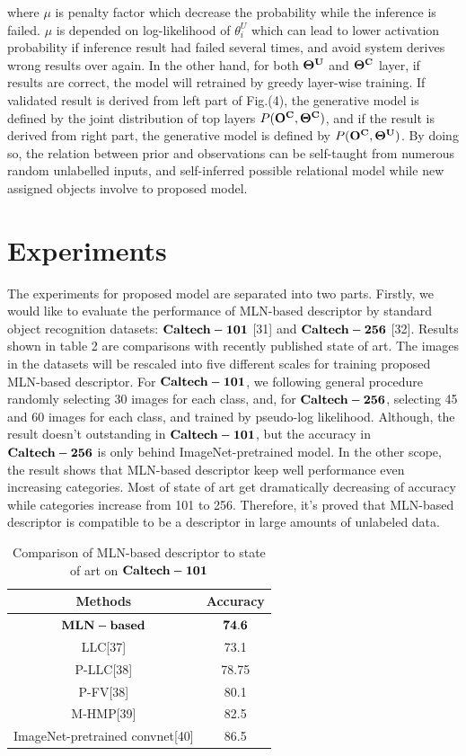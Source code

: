 \documentclass[journal]{IEEEtran}
\begin{document}
where $\mu$ is penalty factor which decrease the probability while the inference is failed. $\mu$ is depended on log-likelihood of $\theta^U_i$ which can lead to lower activation probability if inference result had failed several times, and avoid system derives wrong results over again. 
In the other hand, for both $\bf{\Theta^U}$ and $\bf{\Theta^C}$ layer, if results are correct, the model will retrained by greedy layer-wise training. If validated result is derived from left part of Fig.(4), the generative model is defined by the joint distribution of top layers $P(\bf{O^C} , \bf{\Theta^C})$, and if the result is derived from right part, the generative model is defined by  $P(\bf{O^C} , \bf{\Theta^U})$. By doing so, the relation between prior and observations can be self-taught from numerous random unlabelled inputs, and self-inferred possible relational model while new assigned objects involve to proposed model.



\section{Experiments}
The experiments for proposed model are separated into two parts. Firstly, we would like to evaluate the performance of MLN-based descriptor by standard object recognition datasets: $\bf{Caltech-101}$ [31] and $\bf{Caltech-256}$ [32]. Results shown in table 2 are comparisons with recently published state of art. The images in the datasets will be rescaled into five different scales for training proposed MLN-based descriptor. For $\bf{Caltech-101}$, we following general procedure randomly selecting 30 images for each class, and, for $\bf{Caltech-256}$, selecting 45 and 60 images for each class, and trained by pseudo-log likelihood. Although, the result doesn't outstanding in $\bf{Caltech-101}$, but the accuracy in $\bf{Caltech-256}$ is only behind ImageNet-pretrained model. In the other scope, the result shows that MLN-based descriptor keep well performance even increasing categories. Most of state of art get dramatically decreasing  of accuracy while categories increase from 101 to 256. Therefore, it's proved that MLN-based descriptor is compatible to be a descriptor in large amounts of unlabeled data.


\begin{table}[!t]
\caption{Comparison of MLN-based descriptor to state of art on $\bf{Caltech-101}$}
\begin{center}
\begin{tabular}{|c|c|}
\hline
Methods & Accuracy \\
\hline
$\bf{MLN-based}$ & $\bf{74.6}$ \\
\hline
LLC[37] & 73.1 \\
\hline
P-LLC[38] & 78.75\\
\hline
P-FV[38] & 80.1\\
\hline
M-HMP[39] & 82.5 \\
\hline
ImageNet-pretrained convnet[40] & 86.5 \\
\hline
\end{tabular}
\end{center}
\end{table}
\end{document}
